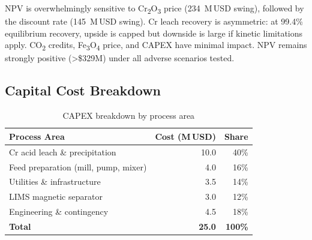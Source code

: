 \documentclass[11pt,a4paper]{article}
\begin{document}
\begin{figure}[H]
\end{figure}

\noindent NPV is overwhelmingly sensitive to Cr\textsubscript{2}O\textsubscript{3}
price (234~M\,USD swing), followed by the discount rate (145~M\,USD swing).
Cr leach recovery is asymmetric: at 99.4\% equilibrium recovery, upside is
capped but downside is large if kinetic limitations apply.  CO\textsubscript{2}
credits, Fe\textsubscript{3}O\textsubscript{4} price, and CAPEX have minimal
impact.  NPV remains strongly positive (\textgreater\$329M) under all
adverse scenarios tested.

\subsection{Capital Cost Breakdown}

\begin{table}[H]
\centering
\caption{CAPEX breakdown by process area}
\label{tab:capex}
\begin{tabular}{@{}lrr@{}}
\toprule
\textbf{Process Area} & \textbf{Cost (M\,USD)} & \textbf{Share} \\
\midrule
Cr acid leach \& precipitation   & 10.0 & 40\% \\
Feed preparation (mill, pump, mixer) & 4.0 & 16\% \\
Utilities \& infrastructure         & 3.5 & 14\% \\
LIMS magnetic separator             & 3.0 & 12\% \\
Engineering \& contingency          & 4.5 & 18\% \\
\midrule
\textbf{Total}                       & \textbf{25.0} & \textbf{100\%} \\
\bottomrule
\end{tabular}
\end{table}
\end{document}
